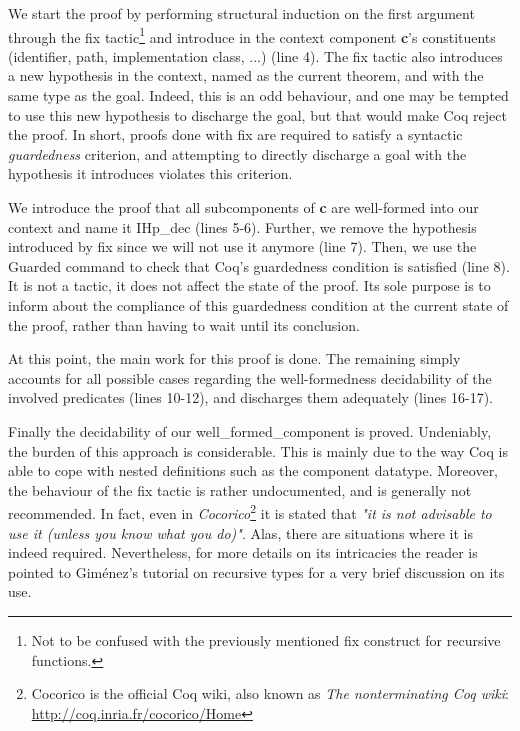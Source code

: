 	\noindent We start the proof by performing structural induction on the first argument through
	the \textsf{fix} tactic\footnote{Not to be confused with the previously mentioned 
	\textsf{fix} construct for recursive functions.} and introduce in the 
	context \textsf{component} \textbf{c}'s constituents (identifier, path, implementation class, ...) (line 4). 
	The \textsf{fix} tactic also introduces a new hypothesis in the context, 
	named as the current theorem, and with the same type as the goal. Indeed, this is an odd
	behaviour, and one may be tempted to use this new hypothesis to discharge the goal, but that would make
	Coq reject the proof. In short, proofs done with \textsf{fix} are required to satisfy a syntactic 
	\textit{guardedness} criterion, and attempting to directly discharge a goal with the hypothesis it
	introduces violates this criterion.	
	
		We introduce the proof that all sub\textsf{component}s of \textbf{c} are
	well-formed into our context and name it \textsf{IHp\_dec} (lines 5-6). Further, we
	remove the hypothesis introduced by \textsf{fix} since we will not use it anymore (line 7).
	Then, we use the \textsf{Guarded} command to check that Coq's guardedness 
	condition is satisfied (line 8). It is not a tactic, it does not affect the state of the
	proof. Its sole purpose is to inform about the compliance of this guardedness condition
	at the current state of the proof, rather than having to wait until its conclusion.

		At this point, the main work for this proof is done. The remaining simply
	accounts for all possible cases regarding the well-formedness decidability of 
	the involved predicates (lines 10-12), and discharges them adequately (lines 16-17).
	

		Finally the decidability of our \textsf{well\_formed\_component} is proved. Undeniably, 
	the burden of this approach is considerable. This is mainly due to the way Coq is able to cope
	with nested definitions such as the \textsf{component} datatype. Moreover, the behaviour 
	of the \textsf{fix} tactic is rather undocumented, and is generally not recommended. In fact, even in
	\textit{Cocorico}\footnote{Cocorico is the official Coq wiki, also known as \textit{The nonterminating Coq wiki}: \url{http://coq.inria.fr/cocorico/Home}} it is stated that \textit{"it is not advisable to use it (unless you know what you do)"}.
	Alas, there are situations where it is indeed required. Nevertheless, for more details on its intricacies the reader is pointed to 
	Gim\'enez's tutorial on recursive types \cite{Giménez98atutorial} for a very brief discussion on its use. 
	
